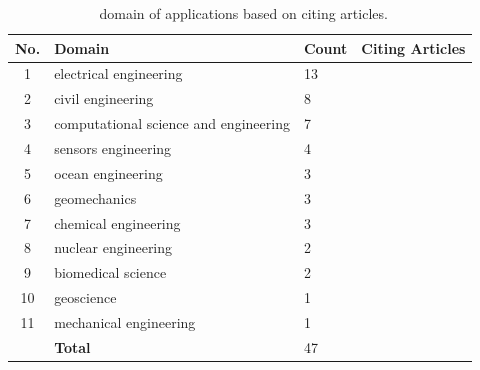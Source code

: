 \documentclass[11pt]{article}
\begin{document}
\begin{table}[!ht]
    \centering
    \caption{\uqlab~domain of applications based on citing articles.}
    \label{tab:citing_articles} 
    \begin{tabularx}{\textwidth}{cllX}\toprule
      \textbf{No.} & \textbf{Domain} & \textbf{Count} & \textbf{Citing Articles}\\\midrule        
      1           & electrical engineering                 &  13 & \cite{Barbi2018,Ni2018,Larbi2018a,Larbi2018,Larbi2017,Li2017,Larbi2017a,Du2017a,Du2017,Ni2017,Acikgoz2016,Bilicz2016,Bdour2016}\\
      2           & civil engineering                      &   8 & \cite{Fengjie2018,Dutta2018,Hariri-Ardebili2018,Chen2017,Mylonas2017a,Mylonas2017,Sanctis2016,Abdallah2016}\\
      3           & computational science and engineering  &   7 & \cite{Cheng2018,Palar2018,Palar2018a,Kaintura2017,Hashemian2017,Abraham2017,Abraham2016}
      \\
      4           & sensors engineering                    &   4 & \cite{Yuzugullu2017,Erten2016,Erten2016a,Capellari2016}\\
      5           & ocean engineering                      &   3 & \cite{Colone2018,Gaspar2016a,Gaspar2016} \\
      6           & geomechanics                           &   3 & \cite{Toe2018,Toe2017,Mentani2016}\\
      7           & chemical engineering                   &   3 & \cite{Xie2018,Xie2017,Schenkendorf2017}\\
      8           & nuclear engineering                    &   2 & \cite{Turati2018,Wu2018a}\\
      9           & biomedical science                     &   2 & \cite{Chiaramello2017,Perko2016}\\      
      10          & geoscience                             &   1 & \cite{Hamdi2017}\\
      11          & mechanical engineering                 &   1 & \cite{Vohra2018}\\
                  & \textbf{Total}                         &  47 & \\\bottomrule
  \end{tabularx}
\end{table}
\end{document}
